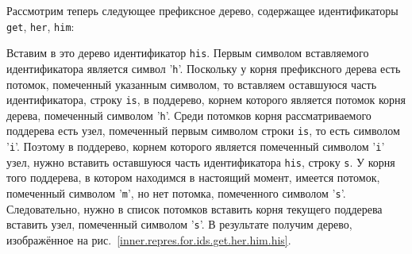 \documentclass[10pt]{report}
\begin{document}
Рассмотрим теперь следующее префиксное дерево, содержащее идентификаторы \texttt{get}, \texttt{her}, \texttt{him}:
\begin{center}
{}
\end{center}
Вставим в это дерево идентификатор \texttt{his}. Первым символом вставляемого идентификатора является символ '\texttt{h}'. Поскольку у корня префиксного дерева есть потомок, помеченный указанным символом, то вставляем оставшуюся часть идентификатора, строку \texttt{is}, в поддерево, корнем которого является потомок корня дерева, помеченный  символом '\texttt{h}'. Среди потомков корня рассматриваемого поддерева есть узел, помеченный первым символом строки \texttt{is}, то есть символом '\texttt{i}'. Поэтому в поддерево, корнем которого является помеченный символом '\texttt{i}' узел, нужно вставить оставшуюся часть идентификатора \texttt{his}, строку \texttt{s}. У корня того поддерева, в котором находимся в настоящий момент, имеется потомок, помеченный символом '\texttt{m}', но нет потомка, помеченного символом '\texttt{s}'. Следовательно, нужно в список потомков вставить корня текущего поддерева вставить узел, помеченный символом '\texttt{s}'. В результате получим дерево, изображённое на рис.~\ref{inner.repres.for.ids.get.her.him.his}.
\end{document}
